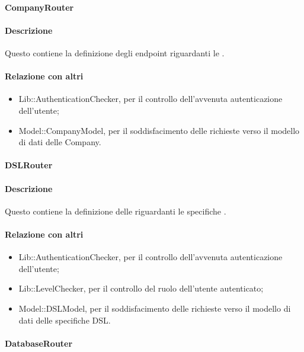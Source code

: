 \paragraph{CompanyRouter}
\paragraph*{Descrizione}
Questo  contiene la definizione degli endpoint riguardanti le .

\paragraph*{Relazione con altri }
\begin{itemize}
\item Lib::AuthenticationChecker, per il controllo dell'avvenuta autenticazione dell'utente;
\item Model::CompanyModel, per il soddisfacimento delle richieste verso il modello di dati delle Company.
\end{itemize}

\paragraph{DSLRouter}
\paragraph*{Descrizione}
Questo  contiene la definizione delle  riguardanti le specifiche .

\paragraph*{Relazione con altri }
\begin{itemize}
\item Lib::AuthenticationChecker, per il controllo dell'avvenuta autenticazione dell'utente;
\item Lib::LevelChecker, per il controllo del ruolo dell'utente autenticato;
\item Model::DSLModel, per il soddisfacimento delle richieste verso il modello di dati delle specifiche DSL.
\end{itemize}

\paragraph{DatabaseRouter}
